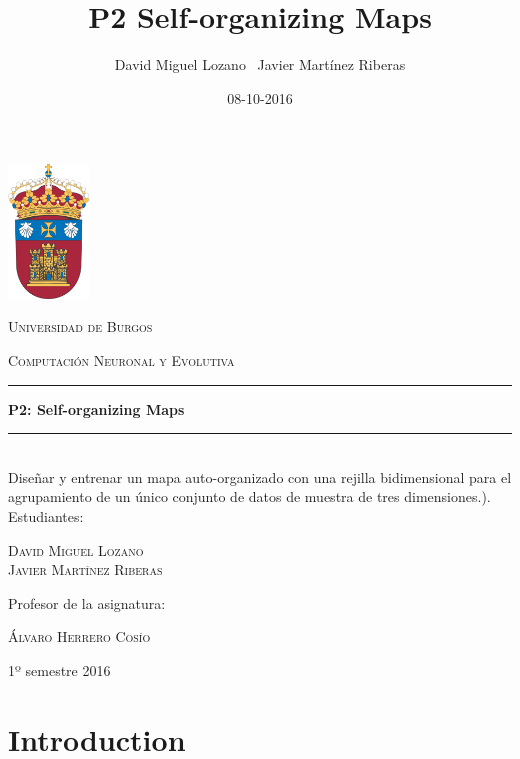 \documentclass[a4paper,12pt,titlepage]{article}
\newcommand{\HRule}[1]{\rule{\linewidth}{#1}}
\begin{document}
\author{David Miguel Lozano \ Javier Martínez Riberas}
\title{P2 Self-organizing Maps}
\date{08-10-2016}

\begin{titlepage}
	\centering
	\includegraphics[width=0.16\textwidth]{ubu-logo.png}\par
	\vspace{0.3cm}
	{\scshape\LARGE Universidad de Burgos \par}
	\vfill
	{\scshape\Large Computación Neuronal y Evolutiva \par}
	\HRule{2pt}
	{\huge\bfseries P2: Self-organizing Maps \par}
	\HRule{2pt}
	\\ [0.5cm]
	{Diseñar y entrenar un mapa auto-organizado con una rejilla bidimensional para el agrupamiento de un único conjunto de datos de muestra de tres dimensiones.).}
	\vfill
	Estudiantes:\par
	{\Large\scshape David Miguel Lozano \\ Javier Martínez Riberas \par}
	\vfill
	Profesor de la asignatura:\par
	\textsc{Álvaro Herrero Cosío}
	\vfill
	{\large 1º semestre 2016 \par}
\end{titlepage}

\newpage
\tableofcontents
\begin{appendix}
\end{appendix}

\newpage

\section{Introduction}
\end{document}
